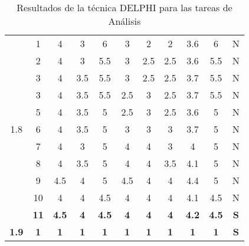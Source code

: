 \documentclass[11pt,a4paper,spanish,twoside]{report}
\begin{document}
\begin{table}[!h]
\begin{tabular}{|c|c||c|c|c|c|c||c|c|c||c|}
    \multirow{11}{*}{1.8} & 1 & 4 & 3 & 6 & 3 & 2 & 2 & 3.6 & 6   & N \\
    & 2 & 4 & 3   & 5.5 & 3   & 2.5 & 2.5 & 3.6 & 5.5 & N \\
    & 3 & 4 & 3.5 & 5.5 & 3   & 2.5 & 2.5 & 3.7 & 5.5 & N \\
    & 3 & 4 & 3.5 & 5.5 & 2.5 & 3   & 2.5 & 3.7 & 5.5 & N \\
    & 5 & 4 & 3.5 & 5   & 2.5 & 3   & 2.5 & 3.6 & 5   & N \\
    & 6 & 4 & 3.5 & 5   & 3   & 3   & 3   & 3.7 & 5   & N \\
    & 7 & 4 & 3   & 5   & 4   & 4   & 3   & 4   & 5   & N \\
    & 8 & 4 & 3.5 & 5   & 4   & 4   & 3.5 & 4.1 & 5   & N \\
    & 9 & 4.5 & 4 & 5 & 4.5 & 4 & 4 & 4.4 & 5 & N \\
    & 10 & 4 & 4 & 4.5 & 4 & 4 & 4 & 4.1 & 4.5 & N \\
    & \textbf{11} & \textbf{4.5} & \textbf{4} & \textbf{4.5} & \textbf{4} & \textbf{4} & \textbf{4} & \textbf{4.2} & \textbf{4.5} & \textbf{S} \\
    \hline

    \textbf{1.9} & \textbf{1} & \textbf{1} & \textbf{1} & \textbf{1} & \textbf{1} & \textbf{1} & \textbf{1} & \textbf{1} & \textbf{1} & \textbf{S} \\
    \hline
  \end{tabular}
  \caption{Resultados de la técnica DELPHI para las tareas de
    Análisis} \label{Tab:anal}
\end{table}
\end{document}
